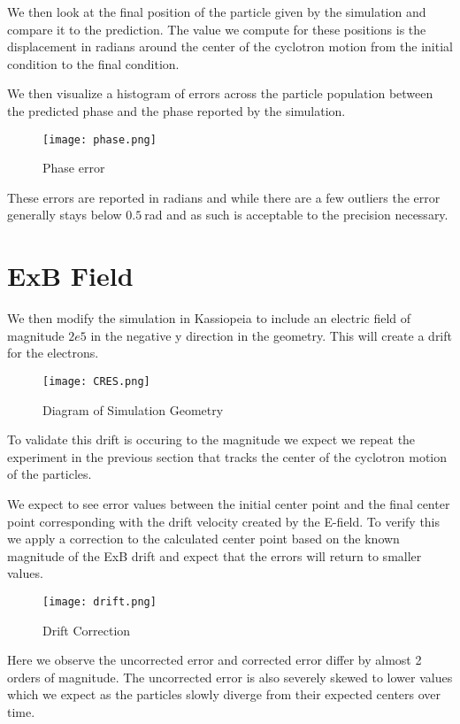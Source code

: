 \documentclass[12pt,letterpaper]{article}
\begin{document}
We then look at the final position of the particle given by the simulation and compare it to the prediction. The value we compute for these positions is the displacement in radians around the center of the cyclotron motion from the initial condition to the final condition. 

We then visualize a histogram of errors across the particle population between the predicted phase and the phase reported by the simulation.

    \begin{figure}[H]
    \centering
    \texttt{[image: phase.png]}
    \caption{Phase error}
    \end{figure}
    
These errors are reported in radians and while there are a few outliers the error generally stays below $0.5~$rad and as such is acceptable to the precision necessary.

\section{ExB Field}

We then modify the simulation in Kassiopeia to include an electric field of magnitude $2e5$ in the negative y direction in the geometry. This will create a drift for the electrons.

    \begin{figure}[H]
    \centering
    \texttt{[image: CRES.png]}
    \caption{Diagram of Simulation Geometry}
    \end{figure}

To validate this drift is occuring to the magnitude we expect we repeat the experiment in the previous section that tracks the center of the cyclotron motion of the particles. 

We expect to see error values between the initial center point and the final center point corresponding with the drift velocity created by the E-field. To verify this we apply a correction to the calculated center point based on the known magnitude of the ExB drift and expect that the errors will return to smaller values.

    \begin{figure}[H]
    \centering
    \texttt{[image: drift.png]}
    \caption{Drift Correction}
    \end{figure}

Here we observe the uncorrected error and corrected error differ by almost 2 orders of magnitude. The uncorrected error is also severely skewed to lower values which we expect as the particles slowly diverge from their expected centers over time. 
\end{document}
